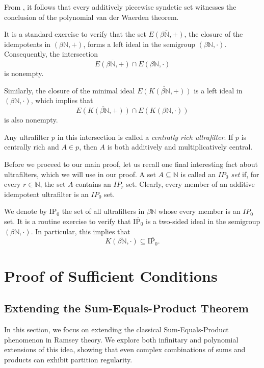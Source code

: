 \documentclass{article}
\theoremstyle{Theorem}
\theoremstyle{definition}
\begin{document}
From \cite{2, 30}, it follows that every additively piecewise syndetic set witnesses the conclusion of the polynomial van der Waerden theorem.

It is a standard exercise to verify that the set \( \overline{E(\beta \mathbb{N}, +)} \), the closure of the idempotents in \( (\beta \mathbb{N}, +) \), forms a left ideal in the semigroup \( (\beta \mathbb{N}, \cdot) \). Consequently, the intersection 
\[
\overline{E(\beta \mathbb{N}, +)} \cap E(\beta \mathbb{N}, \cdot)
\]
is nonempty.

Similarly, the closure of the minimal ideal \( \overline{E(K(\beta \mathbb{N}, +))} \) is a left ideal in \( (\beta \mathbb{N}, \cdot) \), which implies that
\[
\overline{E(K(\beta \mathbb{N}, +))} \cap E(K(\beta \mathbb{N}, \cdot))
\]
is also nonempty.

Any ultrafilter \( p \) in this intersection is called a \emph{centrally rich ultrafilter}. If \( p \) is centrally rich and \( A \in p \), then \( A \) is both additively and multiplicatively central.


Before we proceed to our main proof, let us recall one final interesting fact about ultrafilters, which we will use in our proof. A set \( A \subseteq \mathbb{N} \) is called an \emph{\(IP_0\) set} if, for every \( r \in \mathbb{N} \), the set \( A \) contains an \(IP_r\) set. Clearly, every member of an additive idempotent ultrafilter is an \(IP_0\) set.

We denote by \( \overline{\mathrm{IP}_0} \) the set of all ultrafilters in \( \beta \mathbb{N} \) whose every member is an \(IP_0\) set. It is a routine exercise to verify that \( \overline{\mathrm{IP}_0} \) is a two-sided ideal in the semigroup \( (\beta \mathbb{N}, \cdot) \). In particular, this implies that
\[
\overline{K(\beta \mathbb{N}, \cdot)} \subseteq \overline{\mathrm{IP}_0}.
\]



\section{Proof of Sufficient Conditions}

\subsection{Extending the Sum-Equals-Product Theorem}

In this section, we focus on extending the classical Sum-Equals-Product phenomenon in Ramsey theory. We explore both infinitary and polynomial extensions of this idea, showing that even complex combinations of sums and products can exhibit partition regularity. 
\end{document}
